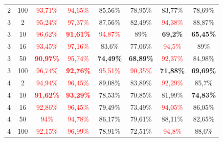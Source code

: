 \begin{table}[ht]
\begin{tabular}{cc|c|c|c|c|c|c}
        {2} & {100} & \textcolor{red}{93,71\%}          & \textcolor{red}{94,65\%}          & {85,56\%}                & {78,95\%}                 & {83,77\%}                 & {78,69\%}                 \\
        {3} & {2}   & \textcolor{red}{95,24\%}          & \textcolor{red}{97,37\%}          & {87,56\%}                & {82,49\%}                 & \textcolor{red}{94,38\%}  & {88,87\%}                 \\
        {3} & {10}  & \textcolor{red}{96,62\%}          & \textcolor{red}{\textbf{91,61\%}} & \textcolor{red}{94,87\%} & {89\%}                    & \textbf{69,2\%}           & \textbf{65,45\%}          \\
        {3} & {16}  & \textcolor{red}{93,45\%}          & \textcolor{red}{97,16\%}          & {83,6\%}                 & {77,06\%}                 & \textcolor{red}{94,5\%}   & {89\%}                    \\
        {3} & {50}  & \textcolor{red}{\textbf{90,97\%}} & \textcolor{red}{95,74\%}          & \textbf{74,49\%}         & \textbf{68,89\%}          & \textcolor{red}{92,37\%}  & {84,98\%}                 \\
        {3} & {100} & \textcolor{red}{96,74\%}          & \textcolor{red}{\textbf{92,76\%}} & \textcolor{red}{95,51\%} & \textcolor{red}{90,35\%}  & \textbf{71,88\%}          & \textbf{69,69\%}          \\
        {4} & {2}   & \textcolor{red}{94,94\%}          & \textcolor{red}{96,45\%}          & {89,08\%}                & {83,89\%}                 & \textcolor{red}{92,29\%}  & {85,7\%}                  \\
        {4} & {10}  & \textcolor{red}{\textbf{91,62\%}} & \textcolor{red}{\textbf{93,29\%}} & {78,53\%}                & {70,85\%}                 & {81,99\%}                 & \textbf{74,83\%}          \\
        {4} & {16}  & \textcolor{red}{92,86\%}          & \textcolor{red}{96,45\%}          & {79,49\%}                & {73,49\%}                 & \textcolor{red}{94,05\%}  & {86,05\%}                 \\
        {4} & {50}  & \textcolor{red}{94\%}             & \textcolor{red}{94,78\%}          & {86,17\%}                & {79,61\%}                 & {88,11\%}                 & {82,65\%}                 \\
        {4} & {100} & \textcolor{red}{92,15\%}          & \textcolor{red}{96,99\%}          & {78,91\%}                & {72,51\%}                 & \textcolor{red}{94,8\%}   & {88,6\%}                  \\

\end{tabular}
\end{table}
